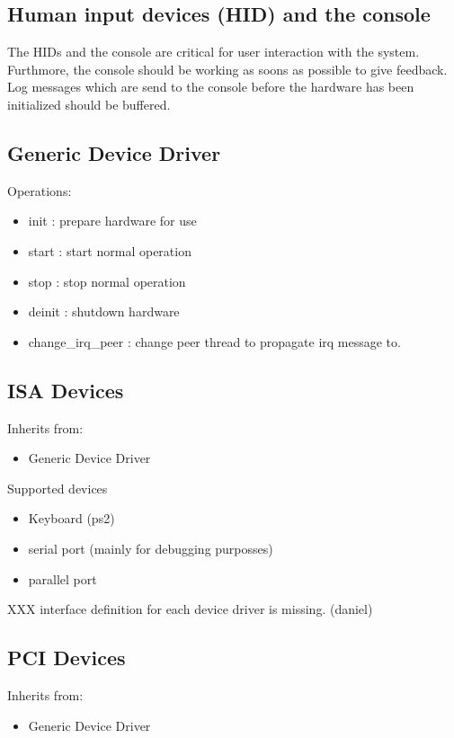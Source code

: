 \subsection{Human input devices (HID) and the console}

The HIDs and the console are critical for user interaction with the
system.  Furthmore, the console should be working as soons as possible
to give feedback.  Log messages which are send to the console before
the hardware has been initialized should be buffered.

\subsection{Generic Device Driver}

Operations:
\begin{itemize}
\item init : prepare hardware for use
\item start : start normal operation
\item stop : stop normal operation
\item deinit : shutdown hardware
\item change\_irq\_peer : change peer thread to propagate irq message to.
\end{itemize}

\subsection{ISA Devices}

Inherits from:
\begin{itemize}
\item Generic Device Driver
\end{itemize}

Supported devices
\begin{itemize}
\item Keyboard (ps2)
\item serial port (mainly for debugging purposses)
\item parallel port
\end{itemize}

XXX interface definition for each device driver is missing. (daniel)

\subsection{PCI Devices}

Inherits from:
\begin{itemize}
\item Generic Device Driver
\end{itemize}

